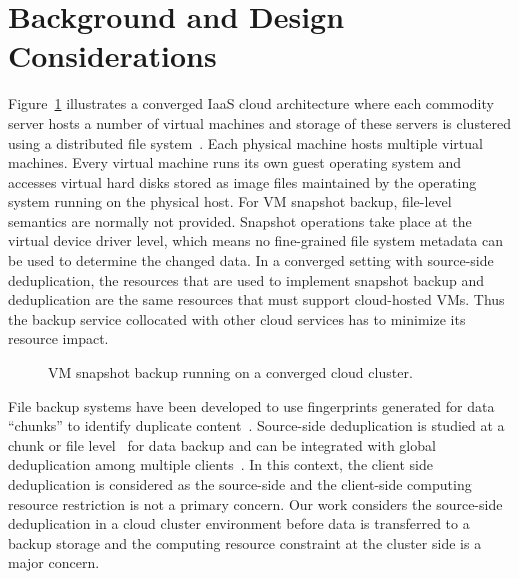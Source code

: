 \section{Background and Design Considerations}
\label{sect:background}

Figure~\ref{fig:collocated} illustrates a converged IaaS cloud architecture 
where
each commodity server hosts a number of virtual machines and storage of these servers
is clustered using a distributed file system~\cite{googlefs03,hdfs10}.
Each physical machine hosts multiple virtual machines.  Every virtual machine
runs its own guest operating system and accesses virtual hard disks 
stored as image files maintained by the operating system running on the
physical host. 
For VM snapshot backup, file-level semantics are normally not provided.
Snapshot operations take place at the virtual device driver level, which
means no fine-grained file system metadata can be used to determine the changed data. 
In a converged setting with source-side deduplication, the resources that are used to implement snapshot
backup and deduplication are the same resources that must support cloud-hosted
VMs.  Thus the backup service collocated with 
other cloud services has to minimize its resource impact.  





\begin{figure}[htb]
    \centering
    \resizebox{0.85\linewidth}{!}{
        
    }
    \caption{VM snapshot backup running on a converged cloud cluster.}
    \label{fig:collocated}
\end{figure}

File backup systems have been developed to use fingerprints generated for
data ``chunks''  to identify duplicate
content~\cite{venti02,Rhea2008}.  
Source-side deduplication is studied at a chunk or file
level~\cite{Vrable2009,Tan2010} for data backup and can be
integrated  with global deduplication among multiple clients~\cite{Fu2014}.
In this context, the client side deduplication is considered as the source-side
and the client-side computing resource  restriction is not a primary concern.
Our work considers the source-side deduplication in a cloud cluster environment before data is transferred
to a backup storage and the computing resource constraint at the cluster side is a major concern.

